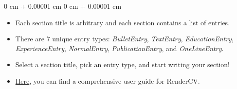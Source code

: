 \documentclass[10pt, letterpaper]{article}
\newenvironment{highlightsforbulletentries}{
    \begin{itemize}[
        topsep=0.10 cm,
        parsep=0.10 cm,
        partopsep=0pt,
        itemsep=0pt,
        leftmargin=10pt
    ]
}{
    \end{itemize}
} %
\newenvironment{onecolentry}{
    \begin{adjustwidth}{
        0 cm + 0.00001 cm
    }{
        0 cm + 0.00001 cm
    }
}{
    \end{adjustwidth}
} %
\begin{document}
    \begin{onecolentry}
        \begin{highlightsforbulletentries}


        \item Each section title is arbitrary and each section contains a list of entries.

        \item There are 7 unique entry types: \textit{BulletEntry}, \textit{TextEntry}, \textit{EducationEntry}, \textit{ExperienceEntry}, \textit{NormalEntry}, \textit{PublicationEntry}, and \textit{OneLineEntry}.

        \item Select a section title, pick an entry type, and start writing your section!

        \item \href{https://docs.rendercv.com/user_guide/}{Here}, you can find a comprehensive user guide for RenderCV.


        \end{highlightsforbulletentries}
    \end{onecolentry}
\end{document}
